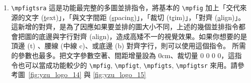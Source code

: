 \begin{enumerate}
{\centering\begin{lstlisting}[caption={mpfigtsr 使用範例碼},
label=lst:mpfigtsr,
numbers=left,
firstnumber=1,
frame=ltrb, % single lines for left, top, right, bottom; LTRB for double lines 
%escapeinside={$$}, %如要在列表裡顯示特殊字元/排版效果，要把該文字串用 $$ 包夾住 (適合 C 程式碼)(原預設為 <>)
]
\begin{figure}[tbph]
%
\mpfigtsr{0.25} %width in terms of \columnwidth
{figs/example_fig} %path/filename (no space)
{<使用 mpfigtsr 展示裁切少的校徽>} %caption
{fig:yzu_logo_10} %label
{<原圖擷取自元智大學網頁>} %additional text beneath the caption
{0ex} % additional spacing between fig and caption
{5 5 5 5} % left, top, right, bottom trimming, in unit of bp (=1/72 in)
%
\hfill
%
\mpfigtsr{0.25} %width in terms of \columnwidth
{figs/example_fig} %path/filename (no space)
{<使用 mpfigtsr 展示裁切多的校徽>} %caption
{fig:yzu_logo_11} %label
{<原圖擷取自元智大學網頁>} %additional text beneath the caption
{0ex} % additional spacing between fig and caption
{20 20 20 20} % left, top, right, bottom trimming, in unit of bp (=1/72 in)
%
\end{figure}
\end{lstlisting}\par}

%
\begin{figure}[tbph]
%
{figs/example_fig} %
{使用 mpfigtsr 展示裁切少的校徽} %
{fig:yzu_logo_10} %
{原圖擷取自元智大學網頁} %
{0ex} %
{5 5 5 5} %
%
\hfill
%
{figs/example_fig} %
{使用 mpfigtsr 展示裁切多的校徽} %
{fig:yzu_logo_11} %
{原圖擷取自元智大學網頁} %
{0ex} %
{20 20 20 20} %
%
\end{figure}


\item \verb+\mpfigtsra+ 這是功能最完整的多圖並排指令，將基本的 \verb+\mpfig+ 加上「交代來源的文字 (\uline{t}ext)」，「與文字間距 (\uline{s}pacing)」，「裁切 (t\uline{r}im)」，「對齊 (\uline{a}lign)」。這新增的對齊，是為了因應如果要並排的圖大小不同，上述的幾個並排指令都會把圖的底邊與字行對齊 (align)，造成高矮不一的視覺效果。如果你想要的是頂邊 (t) 、腰線 (中線 c)、或底邊 (b) 對齊字行，則可以使用這個指令。
所需的參數也最多。把文字參數空著、間距增量設為 0cm、裁切量 0 0 0 0，這指令也可以當成功能較少的 \verb+\mpfig+, \verb+\mpfigt+, \verb+\mpfigts+, \verb+\mpfigtsr+ 來用。請參考圖~\ref{fig:yzu_logo_14} 與 \ref{fig:yzu_logo_15}


\end{enumerate}
